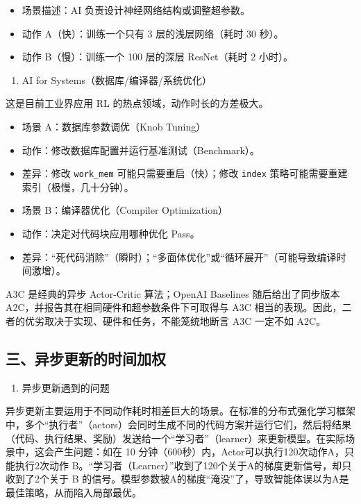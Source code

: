 \begin{itemize}
\tightlist
\item
  场景描述：AI 负责设计神经网络结构或调整超参数。
\item
  动作 A（快）：训练一个只有 3 层的浅层网络（耗时 30 秒）。
\item
  动作 B（慢）：训练一个 100 层的深层 ResNet（耗时 2 小时）。
\end{itemize}

\begin{enumerate}
\def\labelenumi{\arabic{enumi}.}
\setcounter{enumi}{1}
\tightlist
\item
  AI for Systems（数据库/编译器/系统优化）
\end{enumerate}

这是目前工业界应用 RL 的热点领域，动作时长的方差极大。

\begin{itemize}
\tightlist
\item
  场景 A：数据库参数调优（Knob Tuning）
\item
  动作：修改数据库配置并运行基准测试（Benchmark）。
\item
  差异：修改 \texttt{work\_mem} 可能只需要重启（快）；修改 \texttt{index} 策略可能需要重建索引（极慢，几十分钟）。
\item
  场景 B：编译器优化（Compiler Optimization）
\item
  动作：决定对代码块应用哪种优化 Pass。
\item
  差异：``死代码消除''（瞬时）；``多面体优化''或``循环展开''（可能导致编译时间激增）。
\end{itemize}

A3C 是经典的异步 Actor-Critic 算法；OpenAI Baselines 随后给出了同步版本 A2C，并报告其在相同硬件和超参数条件下可取得与 A3C 相当的表现。因此，二者的优劣取决于实现、硬件和任务，不能笼统地断言 A3C 一定不如 A2C。

\hypertarget{ux4e09ux5f02ux6b65ux66f4ux65b0ux7684ux65f6ux95f4ux52a0ux6743}{%
\subsection{三、异步更新的时间加权}\label{ux4e09ux5f02ux6b65ux66f4ux65b0ux7684ux65f6ux95f4ux52a0ux6743}}

\begin{enumerate}
\def\labelenumi{\arabic{enumi}.}
\tightlist
\item
  异步更新遇到的问题
\end{enumerate}

异步更新主要运用于不同动作耗时相差巨大的场景。在标准的分布式强化学习框架中，多个``执行者''（actors）会同时生成不同的代码方案并运行它们，然后将结果（代码、执行结果、奖励）发送给一个``学习者''（learner）来更新模型。在实际场景中，这会产生问题：如在 10 分钟（600秒）内，Actor可以执行120次动作A，只能执行2次动作 B。``学习者（Learner）''收到了120个关于A的梯度更新信号，却只收到了2个关于 B 的信号。模型参数被A的梯度``淹没''了，导致智能体误以为A是最佳策略，从而陷入局部最优。

